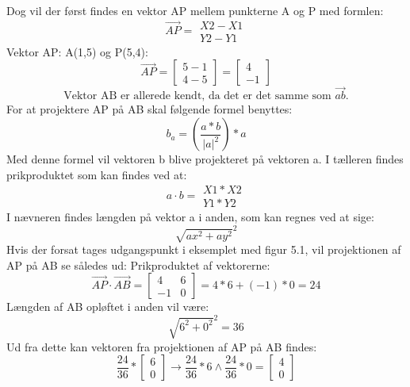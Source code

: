 Dog vil der først findes en vektor AP mellem punkterne A og P med formlen: \[ \overrightarrow{AP} = \begin{matrix}X2-X1 \\ Y2-Y1\end{matrix} \]
Vektor AP: A(1,5) og P(5,4): \[ \overrightarrow{AP} = \begin{bmatrix}5-1 \\ 4-5\end{bmatrix} = \begin{bmatrix} 4 \\ -1 \end{bmatrix} \]
\[ \text{Vektor AB er allerede kendt, da det er det samme som } \overrightarrow{ab} \text{.} \]
For at projektere AP på AB skal følgende formel benyttes: \citep{ProjektionAfVektor} \[ b_{a} = (\frac{a*b}{|a|^2}) * a \]
Med denne formel vil vektoren b blive projekteret på vektoren a. I tælleren findes prikproduktet som kan findes ved at: \[ a \cdot b = \begin{matrix}X1 * X2 \\ Y1 * Y2\end{matrix}  \]
I nævneren findes længden på vektor a i anden, som kan regnes ved at sige: \[ \sqrt{ax^2+ay^2}^2 \]
Hvis der forsat tages udgangspunkt i eksemplet med figur 5.1, vil projektionen af AP på AB se således ud:
Prikproduktet af vektorerne: \[ \overrightarrow{AP} \cdot \overrightarrow{AB} = \begin{bmatrix} 4 & 6 \\ -1 & 0 \end{bmatrix} = 4*6+(-1)*0 = 24 \]
Længden af AB opløftet i anden vil være: \[ \sqrt{6^2+0^2}^2 = 36 \]
Ud fra dette kan vektoren fra projektionen af AP på AB findes: 
\[ \frac{24}{36} * \begin{bmatrix} 6 \\ 0 \end{bmatrix} \rightarrow \frac{24}{36} * 6 \wedge \frac{24}{36} * 0 = \begin{bmatrix} 4 \\ 0 \end{bmatrix} \]


